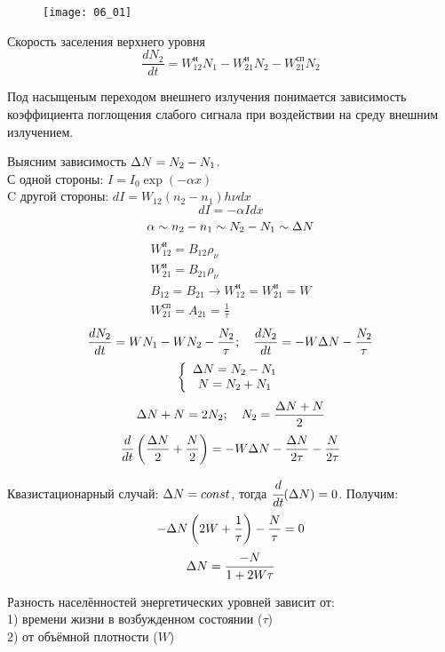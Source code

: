 
\begin{figure}[h]
	\center
	\texttt{[image: 06\_01]}
\end{figure}

Скорость заселения верхнего уровня
\[
	\frac{dN_2}{dt} = W^\text{и}_{12} N_1 - W^\text{и}_{21} N_2 - 
    	W^\text{сп}_{21} N_2
\]

Под насыщеным переходом внешнего излучения понимается зависимость коэффициента 
поглощения слабого сигнала при воздействии на среду внешним излучением.

Выясним зависимость \( \Delta N = N_2 - N_1 \). \\
С одной стороны: \( I = I_0 \exp(-\alpha x) \) \\
C другой стороны: \( dI = W_{12}(n_2 - n_1 ) h\nu dx \)
\[ 
	dI = -\alpha I dx
\]
\[
	\alpha \sim n_2 - n_1 \sim N_2 - N_1 \sim \Delta N 
\]
\[
\begin{array}{c}
	W^\text{и}_{12} = B_{12} \rho_\nu \\
    W^\text{и}_{21} = B_{21} \rho_\nu \\
    B_{12} = B_{21} \rightarrow W^\text{и}_{12} = W^\text{и}_{21} = W \\
    W^\text{сп}_{21} = A_{21} = \frac{1}{\tau}
\end{array} 
\]
\[
	\frac{dN_2}{dt} = WN_1 - WN_2 - \frac{N_2}{\tau};\quad
    \frac{dN_2}{dt} = -W\Delta N - \frac{N_2}{\tau}
\]
\[
	\left\{ \begin{array}{c}
    	\Delta N = N_2 - N_1 \\
        N = N_2 + N_1 
    \end{array} \right.
\]
\[
	\Delta N + N = 2N_2;\quad
    N_2 = \frac{\Delta N + N}{2}
\]
\[
	\frac{d}{dt}\left( \frac{\Delta N}{2} + \frac{N}{2} \right) = -W\Delta N - 
    	\frac{\Delta N}{2\tau} - \frac{N}{2\tau}
\]

Квазистационарный случай: \( \Delta N = const \), тогда 
\( \cfrac{d}{dt}(\Delta N) = 0 \). Получим:
\[
	-\Delta N\left( 2W + \frac{1}{\tau} \right) - \frac{N}{\tau} = 0
\]
\[
	\Delta N = \frac{-N}{1+2W\tau}
\]

Разность населённостей энергетических уровней зависит от: \\
1) времени жизни в возбужденном состоянии (\( \tau \)) \\
2) от объёмной плотности (\( W \))